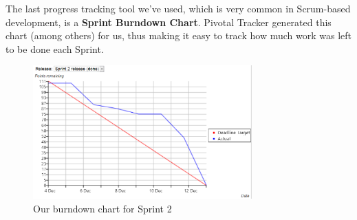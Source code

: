 The last progress tracking tool we've used, which is very common in Scrum-based development, is a  \textbf{Sprint Burndown Chart}. Pivotal Tracker generated this chart (among others) for us, thus making it easy to track how much work was left to be done each Sprint.
\begin{figure}[htb]
	\centering
	\includegraphics[width=0.75\textwidth]{SCRUM/graphics/burndown_chart.png}
	\caption{Our burndown chart for Sprint 2}
	\label{fig:burndownchart}
\end{figure}